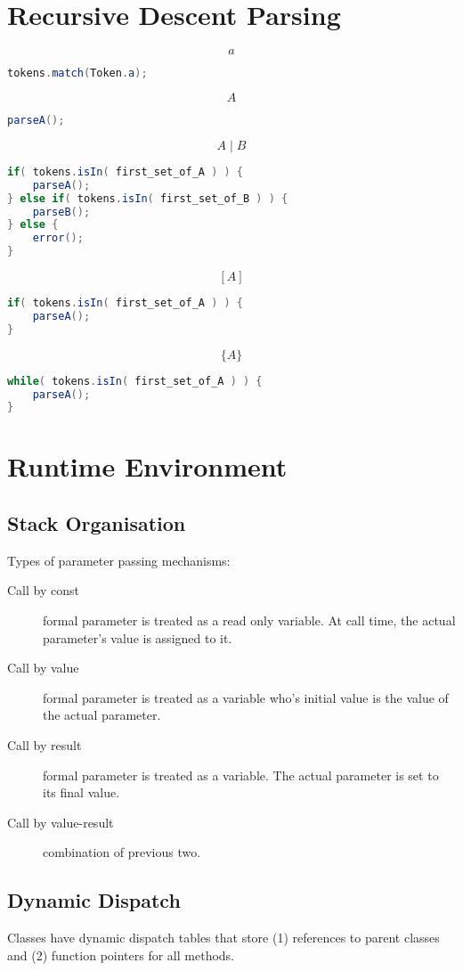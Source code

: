\documentclass[landscape]{cheat}
\begin{document}
\begin{multicols}{3}
\section{Recursive Descent Parsing}
\[ a \]
\begin{lstlisting}[language=Java]
tokens.match(Token.a);
\end{lstlisting}

\[ A \]
\begin{lstlisting}[language=Java]
parseA();
\end{lstlisting}

\[ A \mid B \] 
\begin{lstlisting}[language=Java]
if( tokens.isIn( first_set_of_A ) ) {
    parseA();
} else if( tokens.isIn( first_set_of_B ) ) {
    parseB();
} else {
    error();
}
\end{lstlisting}

\[ [ A ] \]
\begin{lstlisting}[language=Java]
if( tokens.isIn( first_set_of_A ) ) {
    parseA();
}
\end{lstlisting}

\[ \{ A \} \]
\begin{lstlisting}[language=Java]
while( tokens.isIn( first_set_of_A ) ) {
    parseA();
}
\end{lstlisting}

\section{Runtime Environment}
\subsection{Stack Organisation}
Types of parameter passing mechanisms:
\begin{description}
\item[Call by const] formal parameter is treated as a read only variable. At call time, the actual parameter's value is assigned to it.
\item[Call by value] formal parameter is treated as a variable who's initial value is the value of the actual parameter.
\item[Call by result] formal parameter is treated as a variable. The actual parameter is set to its final value.
\item[Call by value-result] combination of previous two.
\end{description}

\subsection{Dynamic Dispatch}
Classes have dynamic dispatch tables that store (1) references to parent classes and (2) function pointers for all methods.


\end{multicols}
\end{document}
